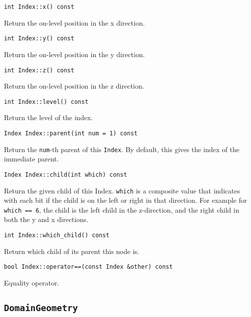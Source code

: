 \begin{lstlisting}
int Index::x() const
\end{lstlisting}

\noindent Return the on-level position in the x direction.

\begin{lstlisting}
int Index::y() const
\end{lstlisting}

\noindent Return the on-level position in the y direction.

\begin{lstlisting}
int Index::z() const
\end{lstlisting}

\noindent Return the on-level position in the z direction.

\begin{lstlisting}
int Index::level() const
\end{lstlisting}

\noindent Return the level of the index.

\begin{lstlisting}
Index Index::parent(int num = 1) const
\end{lstlisting}

\noindent Return the \texttt{num}-th parent of this \texttt{Index}. By default,
this gives the index of the immediate parent.

\begin{lstlisting}
Index Index::child(int which) const
\end{lstlisting}

\noindent Return the given child of this Index. \texttt{which} is a
composite value
that indicates with each bit if the child is on the left or right in that
direction. For example for \texttt{which == 6}, the child is the left child
in the z-direction, and the right child in both the y and x directions.

\begin{lstlisting}
int Index::which_child() const
\end{lstlisting}

\noindent Return which child of its parent this node is.

\begin{lstlisting}
bool Index::operator==(const Index &other) const
\end{lstlisting}

\noindent Equality operator.


\subsection{\texttt{DomainGeometry}}

